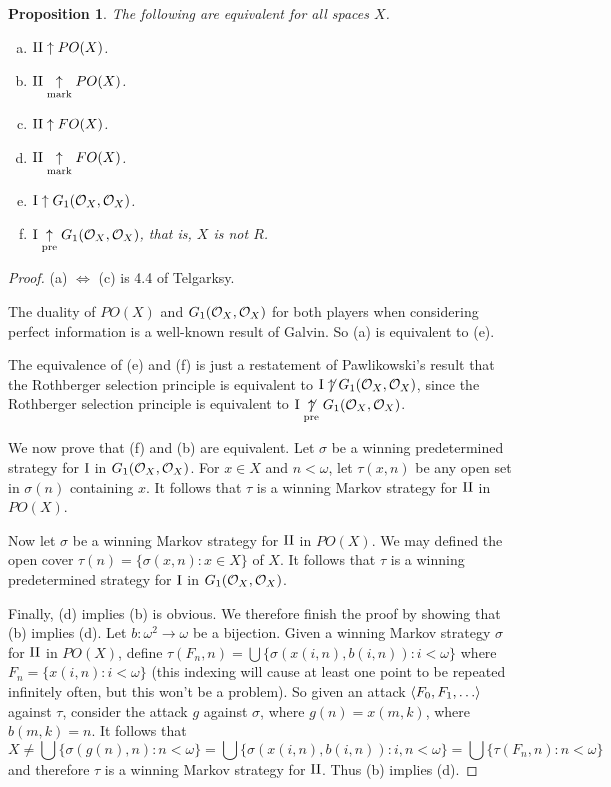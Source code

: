 \documentclass{amsart}
\theoremstyle{plain}
\newtheorem{proposition}[theorem]{Proposition}
\theoremstyle{definition}
\theoremstyle{remark}
\theoremstyle{plain}
\theoremstyle{definition}
\theoremstyle{remark}
\begin{document}
\begin{proposition}
 The following are equivalent for all spaces \(X\).
 \begin{enumerate}[a)]
  \item \(\mathrm{II}\uparrow PO(X)\).
  \item \(\mathrm{II}\underset{\text{mark}}{\uparrow} PO(X)\).
  \item \(\mathrm{II}\uparrow FO(X)\).
  \item \(\mathrm{II}\underset{\text{mark}}{\uparrow} FO(X)\).
  \item \(\mathrm{I}\uparrow G_1(\mathcal{O}_{X},\mathcal{O}_{X})\).
  \item \(\mathrm{I}\underset{\text{pre}}{\uparrow} G_1(\mathcal{O}_{X},\mathcal{O}_{X})\), that is, \(X\) is not \(R\).
 \end{enumerate}
\end{proposition}
\begin{proof}
 (a) \(\Leftrightarrow\) (c) is 4.4 of Telgarksy\cite{Telgársky1975}.

 The duality of \(PO(X)\) and \(G_1(\mathcal{O}_{X},\mathcal{O}_{X})\) for both players when considering perfect information is a well-known result of Galvin\cite{Galvin}. 
 So (a) is equivalent to (e).

 The equivalence of (e) and (f) is just a restatement of Pawlikowski's result that the Rothberger selection principle is equivalent to \(\mathrm{I}\not\uparrow G_1(\mathcal{O}_{X},\mathcal{O}_{X})\)\cite{Pawlikowski}, since the Rothberger selection principle is equivalent to \(\mathrm{I}\underset{\text{pre}}{\not\uparrow}G_1(\mathcal{O}_{X},\mathcal{O}_{X})\).

 We now prove that (f) and (b) are equivalent.
 Let \(\sigma\) be a winning predetermined strategy for \(\mathrm{I}\) in \(G_1(\mathcal{O}_{X},\mathcal{O}_{X})\).
 For \(x\in X\) and \(n<\omega\), let \(\tau(x,n)\) be any open set in \(\sigma(n)\) containing \(x\). 
 It follows that \(\tau\) is a winning Markov strategy for \(\mathrm{II}\) in \(PO(X)\).

 Now let \(\sigma\) be a winning Markov strategy for \(\mathrm{II}\) in \(PO(X)\).
 We may defined the open cover \(\tau(n)=\{\sigma(x,n):x\in X\}\) of \(X\).
 It follows that \(\tau\) is a winning predetermined strategy for \(\mathrm{I}\) in \(G_1(\mathcal{O}_{X},\mathcal{O}_{X})\).

 Finally, (d) implies (b) is obvious.
 We therefore finish the proof by showing that (b) implies (d).
 Let \(b:\omega^2\to\omega\) be a bijection.
 Given a winning Markov strategy \(\sigma\) for \(\mathrm{II}\) in \(PO(X)\), define \(\tau(F_n,n)=\bigcup\{\sigma(x(i,n),b(i,n)):i<\omega\}\) where \(F_n=\{x(i,n):i<\omega\}\) (this indexing will cause at least one point to be repeated infinitely often, but this won't be a problem). 
 So given an attack \(\<F_0,F_1,\dots\>\) against \(\tau\), consider the attack \(g\) against \(\sigma\), where \(g(n)=x(m,k)\), where \(b(m,k) = n\). 
 It follows that
 \[
   X \not= \bigcup\{\sigma(g(n),n):n<\omega\} = \bigcup\{\sigma(x(i,n),b(i,n)):i,n<\omega\} = \bigcup\{\tau(F_n,n):n<\omega\}
 \]
 and therefore \(\tau\) is a winning Markov strategy for \(\mathrm{II}\).
 Thus (b) implies (d).
\end{proof}
\end{document}
